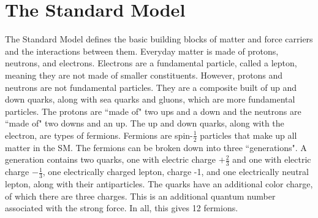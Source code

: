 \section{The Standard Model}
The Standard Model defines the basic building blocks of matter and force carriers and the interactions between them. Everyday matter is made of protons, neutrons, and electrons. Electrons are a fundamental particle, called a lepton, meaning they are not made of smaller constituents. However, protons and neutrons are not fundamental particles. They are a composite built of up and down quarks, along with sea quarks and gluons, which  are more fundamental particles. The protons are ``made of" two ups and a down and the neutrons are ``made of" two downs and an up. The up and down quarks, along with the electron, are types of fermions. \newline
\indent Fermions are spin-${\frac{1}{2}}$ particles that make up all matter in the SM. The fermions can be broken down into three ``generations". A generation contains two quarks, one with electric charge ${+\frac{2}{3}}$ and one with electric charge ${-\frac{1}{3}}$, one electrically charged lepton, charge -1, and one electrically neutral lepton, along with their antiparticles. The quarks have an additional color charge, of which there are three charges. This is an additional quantum number associated with the strong force. In all, this gives 12 fermions. \newline 

